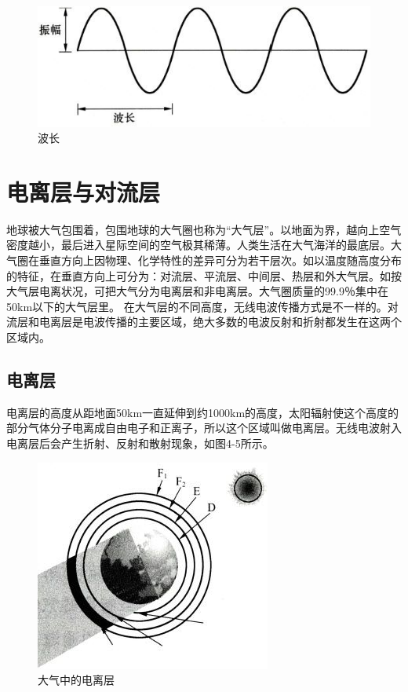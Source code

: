 \documentclass[12pt,UTF8]{ctexbook}
\begin{document}
\begin{figure}[htbp]
	\centering
	\includegraphics[width=0.7\linewidth]{47}
	\caption{波长}
	\label{fig:1}
\end{figure}

\section{电离层与对流层}

地球被大气包围着，包围地球的大气圈也称为“大气层”。以地面为界，越向上空气密度越小，最后进入星际空间的空气极其稀薄。人类生活在大气海洋的最底层。大气圈在垂直方向上因物理、化学特性的差异可分为若干层次。如以温度随高度分布的特征，在垂直方向上可分为：对流层、平流层、中间层、热层和外大气层。如按大气层电离状况，可把大气分为电离层和非电离层。大气圈质量的99.9％集中在50km以下的大气层里。
在大气层的不同高度，无线电波传播方式是不一样的。对流层和电离层是电波传播的主要区域，绝大多数的电波反射和折射都发生在这两个区域内。

\subsection{电离层}

电离层的高度从距地面50km一直延伸到约1000km的高度，太阳辐射使这个高度的部分气体分子电离成自由电子和正离子，所以这个区域叫做电离层。无线电波射入电离层后会产生折射、反射和散射现象，如图4-5所示。

\begin{figure}[htbp]
	\centering
	\includegraphics[width=0.7\linewidth]{48}
	\caption{大气中的电离层}
	\label{fig:1}
\end{figure}
\end{document}

